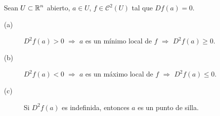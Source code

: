 \begin{theorem}
Sean $\displaystyle U \subset \mathbb{R}^{n} $ abierto, $\displaystyle a \in U $, $\displaystyle f \in \mathcal{C}^{2}\left(U\right) $ tal que $\displaystyle Df\left(a\right) = 0 $.
\begin{description}
\item[(a)] $\displaystyle D^{2}f\left(a\right) > 0 $ $\displaystyle \Rightarrow $ $\displaystyle a $ es un mínimo local de $\displaystyle f $ $\displaystyle \Rightarrow $  $\displaystyle D^{2}f\left(a\right) \geq 0 $.
\item[(b)] $\displaystyle D^{2}f\left(a\right) < 0 $ $\displaystyle \Rightarrow $  $\displaystyle a $ es un máximo local de $\displaystyle f $ $\displaystyle \Rightarrow $  $\displaystyle D^{2}f\left(a\right) \leq 0 $.
\item[(c)] Si $\displaystyle D^{2}f\left(a\right) $ es indefinida, entonces $\displaystyle a $ es un punto de silla. 
\end{description}
\end{theorem}
